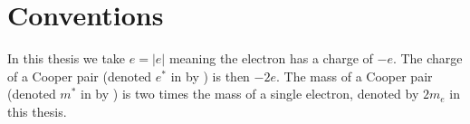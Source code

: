 \chapter*{Conventions}
In this thesis we take $e = |e|$ meaning the electron has a charge of $-e$. The charge of a Cooper pair (denoted $e^*$ in  by \citeauthor{tinkhamIntroductionSuperconductivity}) is then $-2e$. The mass of a Cooper pair (denoted $m^*$ in  by \citeauthor{tinkhamIntroductionSuperconductivity}) is two times the mass of a single electron, denoted by $2m_e$ in this thesis.